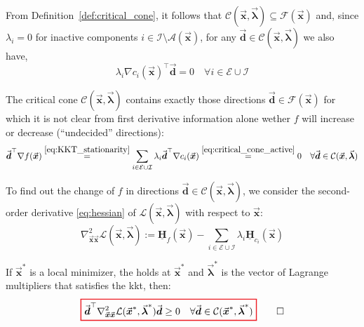\documentclass[9pt, headings=standardclasses, parskip=half]{scrartcl}
\newcommand{\matr}[1]{\underline{\boldsymbol{#1}}}
\newcommand{\vect}[1]{\vec{\boldsymbol{#1}}}
\begin{document}
From Definition~\ref{def:critical_cone}, it follows that \(\mathcal{C}(\vect{x},\vect{\lambda}) \subseteq \mathcal{F}(\vect{x})\) and, since \(\lambda_i = 0\) for inactive components \(i \in \mathcal{I}\setminus\mathcal{A}(\vect{x})\), for any \(\vect{d} \in \mathcal{C}(\vect{x},\vect{\lambda})\) we also have,
\begin{equation}\label{eq:critical_cone_active}
  \lambda_i \nabla c_i(\vect{x})^{\top} \vect{d} = 0 \quad \forall i \in \mathcal{E} \cup \mathcal{I} 
\end{equation}

The critical cone \(\mathcal{C}(\vect{x},\vect{\lambda})\) contains exactly those directions \(\vect{d} \in \mathcal{F}(\vect{x})\) for which it is not clear from first derivative information alone wether \(f\) will increase or decrease (``undecided'' directions):
\begin{equation}\label{eq:critical_cone_contains_undecided}
  \vect{d}^\top \nabla f(\vect{x})
  \overset{\eqref{eq:KKT_stationarity}}{=} 
  \sum_{i\in\mathcal{E}\cup\mathcal{I}} \lambda_i \vect{d}^\top \nabla c_i(\vect{x}) 
  \overset{\eqref{eq:critical_cone_active}}{=} 
  0 \quad \forall \vect{d} \in \mathcal{C}(\vect{x},\vect{\lambda})
  \end{equation}

To find out the change of \(f\) in directions \(\vect{d} \in \mathcal{C}(\vect{x},\vect{\lambda})\), we consider the second-order derivative \eqref{eq:hessian} of \(\mathcal{L}(\vect{x},\vect{\lambda})\) with respect to \(\vect{x}\):
\[
\nabla^{2}_{\vect{x}\vect{x}} \mathcal{L}(\vect{x},\vect{\lambda}) := \matr{H}_{f}(\vect{x}) - \sum_{i\in\mathcal{E}\cup\mathcal{I}} \lambda_{i} \matr{H}_{c_{i}}(\vect{x})
\]

\begin{theorem}\label{thm:SONC}
If \( \vect{x}^{\ast} \) is a local minimizer, the  holds at \(\vect{x}^{\ast}\) and \( \vect{\lambda}^{\ast} \) is the vector of Lagrange multipliers that satisfies the \gls{kkt}, then:
\begin{equation}\label{eq:SONC}
{\color{Red}
\setlength{\fboxrule}{1pt}
\boxed{ 
\color{black}
\vect{d}^{\top} \nabla^{2}_{\vect{x}\vect{x}} \mathcal{L}(\vect{x}^{\ast},\vect{\lambda}^{\ast}) \vect{d} \ge 0 \quad \forall \vect{d}\in\mathcal{C}(\vect{x}^{\ast},\vect{\lambda}^{\ast})
}
}\qedhere
\end{equation}
\end{theorem}
\end{document}
